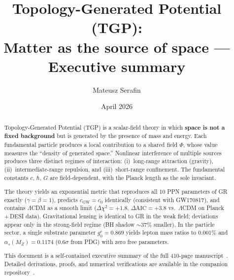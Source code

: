 \documentclass[11pt,a4paper]{article}
\begin{document}
\title{%
  \textbf{Topology-Generated Potential (TGP):}\\[4pt]
  \large Matter as the source of space --- Executive summary%
}
\author{Mateusz Serafin}
\date{April 2026}
\maketitle

\begin{abstract}
Topology-Generated Potential (TGP) is a scalar-field theory in which
\textbf{space is not a fixed background} but is generated by the presence
of mass and energy.  Each fundamental particle produces a local
contribution to a shared field $\Phi$, whose value measures the ``density
of generated space.''  Nonlinear interference of multiple sources produces
three distinct regimes of interaction: (i)~long-range attraction
(gravity), (ii)~intermediate-range repulsion, and (iii)~short-range
confinement.  The fundamental constants $c$, $\hbar$, $G$ are
field-dependent, with the Planck length as the sole invariant.

The theory yields an exponential metric that reproduces all 10 PPN
parameters of GR exactly ($\gamma = \beta = 1$), predicts
$c_{\mathrm{GW}} = c_0$ identically (consistent with GW170817), and
contains $\Lambda$CDM as a smooth limit ($\Delta\chi^2 = +1.8$,
$\Delta\mathrm{AIC} = +3.8$ vs.\ $\Lambda$CDM on Planck\,+\,DESI data).
Gravitational lensing is identical to GR in the weak field; deviations
appear only in the strong-field regime (BH shadow $\sim$37\% smaller).
In the particle sector, a single substrate parameter $g_0^e = 0.869$
yields lepton mass ratios to 0.001\% and $\alpha_s(M_Z) = 0.1174$
($0.6\sigma$ from PDG) with zero free parameters.

This document is a self-contained executive summary of the full
410-page manuscript~\cite{Serafin2026-full}.  Detailed derivations,
proofs, and numerical verifications are available in the companion
repository~\cite{TGP-repo}.
\end{abstract}

\tableofcontents
\newpage













\end{document}
